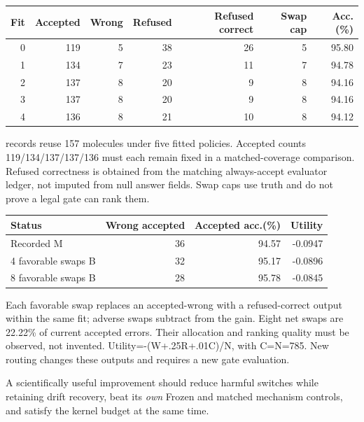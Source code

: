 \documentclass[10pt,letterpaper]{article}
\newcommand{\B}[1]{{\color{GuideBlue}#1}}
\newcommand{\note}[1]{{\fontsize{8.5}{10.5}\selectfont #1\par}}
\newcommand{\sect}[1]{\vspace{5pt}{\large\bfseries #1}\par\vspace{2pt}}
\newenvironment{clean}{\begin{center}\fontsize{9.5}{11.5}\selectfont\setlength{\tabcolsep}{6pt}\renewcommand{\arraystretch}{1.06}}{\end{center}}
\begin{document}
\begin{clean}\begin{tabular}{@{}rrrrrrr@{}}
\toprule
Fit & Accepted & Wrong & Refused & Refused correct & Swap cap & Acc.(\%) \\
\midrule
0 & 119 & 5 & 38 & 26 & 5 & 95.80 \\
1 & 134 & 7 & 23 & 11 & 7 & 94.78 \\
2 & 137 & 8 & 20 & 9 & 8 & 94.16 \\
3 & 137 & 8 & 20 & 9 & 8 & 94.16 \\
4 & 136 & 8 & 21 & 10 & 8 & 94.12 \\
\bottomrule\end{tabular}\end{clean}
\note{785 records reuse 157 molecules under five fitted policies. Accepted counts 119/134/137/137/136 must each remain fixed in a matched-coverage comparison. Refused correctness is obtained from the matching always-accept evaluator ledger, not imputed from null answer fields. Swap caps use truth and do not prove a legal gate can rank them.}
\par\noindent\begin{minipage}{\linewidth}\end{minipage}\par
\begin{clean}\begin{tabular}{@{}lrrr@{}}
\toprule
Status & Wrong accepted & Accepted acc.(\%) & Utility \\
\midrule
Recorded M & 36 & 94.57 & -0.0947 \\
\B{4 favorable swaps B} & \B{32} & \B{95.17} & \B{-0.0896} \\
\B{8 favorable swaps B} & \B{28} & \B{95.78} & \B{-0.0845} \\
\bottomrule\end{tabular}\end{clean}
\note{Each favorable swap replaces an accepted-wrong with a refused-correct output within the same fit; adverse swaps subtract from the gain. Eight net swaps are 22.22\% of current accepted errors. Their allocation and ranking quality must be observed, not invented. Utility=-(W+.25R+.01C)/N, with C=N=785. New routing changes these outputs and requires a new gate evaluation.}
\sect{A joint success criterion}
A scientifically useful improvement should reduce harmful switches while retaining drift recovery,
beat its \emph{own} Frozen and matched mechanism controls, and satisfy the kernel budget at the same time.
\end{document}
